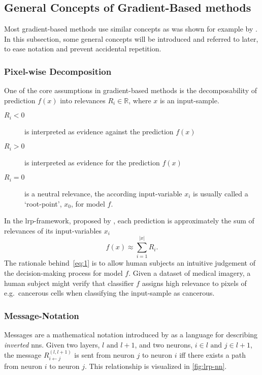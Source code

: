 \subsection{General Concepts of Gradient-Based methods}
Most gradient-based methods use similar concepts as was shown for example by . In this subsection, some general concepts will be introduced and referred to later, to ease notation and prevent accidental repetition.

\subsubsection{Pixel-wise Decomposition}\label{subsubsect:pixel-wise-decomp}
One of the core assumptions in gradient-based methods is the decomposability of prediction \(f(x)\) into relevances \(R_i \in \mathbb R\), where \(x\) is an input-sample. 
\begin{description}
    \item[\(R_i < 0\)] is interpreted as evidence against the prediction \(f(x)\)
    \item[\(R_i > 0\)] is interpreted as evidence for the prediction \(f(x)\)
    \item[\(R_i = 0\)] is a neutral relevance, the according input-variable \(x_i\) is usually called a `root-point'\cite{Bach.2015}, \(x_0\), for model \(f\).
\end{description}
In the \gls{lrp}-framework, proposed by , each prediction is approximately the sum of relevances of its input-variables \(x_i\)
\begin{equation}
    f(x) \approx \sum_{i=1}^{|x|} R_i.\label{eq:1}
\end{equation}
The rationale behind~\cref{eq:1} is to allow human subjects an intuitive judgement of the decision-making process for model \(f\). Given a dataset of medical imagery, a human subject might verify that classifier \(f\) assigns high relevance to pixels of e.g.\ cancerous cells when classifying the input-sample as cancerous.

\subsubsection{Message-Notation}\label{subsubsect:message-notation}
Messages are a mathematical notation introduced by  as a language for describing \textit{inverted} \glspl{nn}. Given two layers, \(l \text{ and } l+1\), and two neurons, \(i\in l \text{ and } j\in l+1\), the message \(R_{i\leftarrow j}^{(l, l+1)}\) is sent from neuron \(j\) to neuron \(i\) iff there exists a \gls{path} from neuron \(i\) to neuron \(j\). This relationship is visualized in \cref{fig:lrp-nn}.
